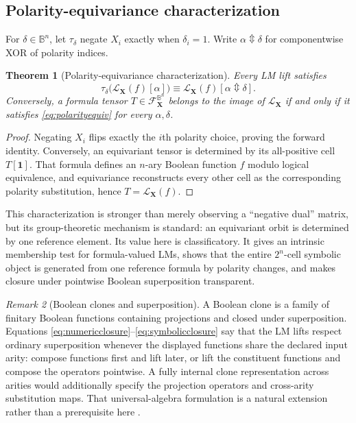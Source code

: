 \documentclass[11pt]{article}
\newtheorem{theorem}{Theorem}[section]
\theoremstyle{definition}
\theoremstyle{remark}
\newtheorem{remark}[theorem]{Remark}
\newcommand{\B}{\mathbb B}
\newcommand{\cF}{\mathcal F}
\newcommand{\xor}{\mathbin{\Updownarrow}}
\begin{document}
\subsection{Polarity-equivariance characterization}

For $\delta\in\B^n$, let $\tau_\delta$ negate $X_i$ exactly when $\delta_i=1$.  Write $\alpha\xor\delta$ for componentwise XOR of polarity indices.
\begin{theorem}[Polarity-equivariance characterization]
Every LM lift satisfies
\begin{equation}
 \tau_\delta\bigl(\mathcal L_{\mathbf X}(f)[\alpha]\bigr)
 \equiv
 \mathcal L_{\mathbf X}(f)[\alpha\xor\delta].
 \label{eq:polarityequiv}
\end{equation}
Conversely, a formula tensor $T\in\cF_{\mathbf X}^{\B^n}$ belongs to the image of $\mathcal L_{\mathbf X}$ if and only if it satisfies \eqref{eq:polarityequiv} for every $\alpha,\delta$.
\end{theorem}
\begin{proof}
Negating $X_i$ flips exactly the $i$th polarity choice, proving the forward identity.  Conversely, an equivariant tensor is determined by its all-positive cell $T[\mathbf1]$.  That formula defines an $n$-ary Boolean function $f$ modulo logical equivalence, and equivariance reconstructs every other cell as the corresponding polarity substitution, hence $T=\mathcal L_{\mathbf X}(f)$.
\end{proof}

This characterization is stronger than merely observing a ``negative dual'' matrix, but its group-theoretic mechanism is standard: an equivariant orbit is determined by one reference element.  Its value here is classificatory.  It gives an intrinsic membership test for formula-valued LMs, shows that the entire $2^n$-cell symbolic object is generated from one reference formula by polarity changes, and makes closure under pointwise Boolean superposition transparent.

\begin{remark}[Boolean clones and superposition]
A Boolean clone is a family of finitary Boolean functions containing projections and closed under superposition.  Equations \eqref{eq:numericclosure}--\eqref{eq:symbolicclosure} say that the LM lifts respect ordinary superposition whenever the displayed functions share the declared input arity: compose functions first and lift later, or lift the constituent functions and compose the operators pointwise.  A fully internal clone representation across arities would additionally specify the projection operators and cross-arity substitution maps.  That universal-algebra formulation is a natural extension rather than a prerequisite here \cite{Post1941}.
\end{remark}
\end{document}
